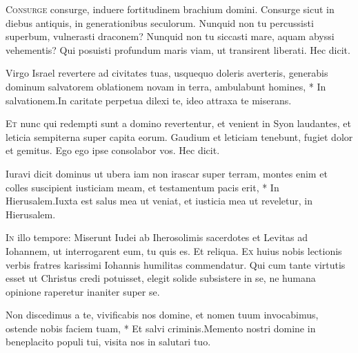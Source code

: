 \begin{multicols*}{2}
\begin{responsory}
\end{responsory}
\lettrine[lines=2]{\zallmancaps \color{Red} C}{onsurge} consurge, induere fortitudinem brachium domini. Consurge sicut in diebus antiquis, in generationibus seculorum. Nunquid non tu percussisti superbum, vulnerasti draconem? Nunquid non tu siccasti mare, aquam abyssi vehementis? Qui posuisti profundum maris viam, ut transirent liberati. Hec dicit.
\begin{responsory}
{Virgo Israel revertere ad civitates tuas, usquequo doleris averteris, generabis dominum salvatorem oblationem novam in terra, ambulabunt homines, * In salvationem.}{In caritate perpetua dilexi te, ideo attraxa te miserans.}
\end{responsory}
\lettrine[lines=2]{\zallmancaps \color{Blue} E}{t} nunc qui redempti sunt a domino revertentur, et venient in Syon laudantes, et leticia
sempiterna super capita eorum. Gaudium et leticiam tenebunt, fugiet dolor et gemitus. Ego ego ipse consolabor vos. Hec dicit.
\begin{responsory-doxology}
{Iuravi dicit dominus ut ubera iam non irascar super terram, montes enim et colles suscipient iusticiam meam, et testamentum pacis erit, * In Hierusalem.}{Iuxta est salus mea ut veniat, et iusticia mea ut reveletur, in Hierusalem.}
\end{responsory-doxology}
\lettrine[lines=2]{\zallmancaps \color{Red} I}{n} illo tempore: Miserunt Iudei ab Iherosolimis sacerdotes et Levitas ad Iohannem, ut interrogarent eum, tu quis es. Et reliqua.
\lettrine[lines=2]{\zallmancaps \color{Blue} E}{x} huius nobis lectionis verbis fratres karissimi Iohannis humilitas commendatur. Qui cum tante virtutis esset ut Christus credi potuisset, elegit solide subsistere in se, ne humana opinione raperetur inaniter super se.
\begin{responsory}
{Non discedimus a te, vivificabis nos domine, et nomen tuum invocabimus, ostende nobis faciem tuam, * Et salvi criminis.}{Memento nostri domine in beneplacito populi tui, visita nos in salutari tuo.}
\end{responsory}

\end{multicols*}
